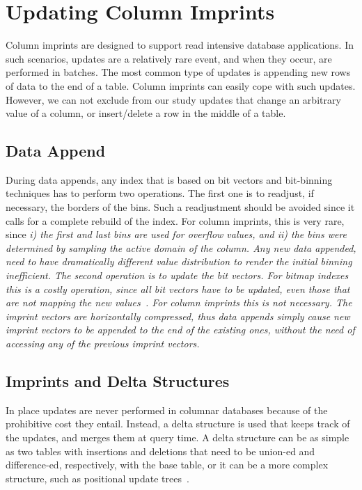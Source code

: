 \section{Updating Column Imprints}\label{sec:updates}

Column imprints are designed to support read intensive database applications.
In such scenarios, updates are a relatively rare event, and when they occur,
are performed in batches. The most common type of updates is appending new
rows of data to the end of a table. Column imprints can easily cope with such
updates. However, we can not exclude from our study updates that change an
arbitrary value of a column, or insert/delete a row in the middle of a table.

\subsection{Data Append}

During data appends, any index that is based on bit vectors and bit-binning
techniques has to perform two operations. The first one is to readjust, if
necessary, the borders of the bins. Such a readjustment should be avoided since
it calls for a complete rebuild of the index. For column imprints, this is very
rare, since \it{i)} the first and last bins are used for overflow values, and
\it{ii)} the bins were determined by sampling the active domain of the column.
Any new data appended, need to have dramatically different value
distribution to render the initial binning inefficient. The second operation
is to update the bit vectors. For bitmap indexes this is a costly
operation, since all bit vectors have to be updated, even those that are not
mapping the new values~\cite{CGF07}. For column imprints this is not necessary.
The imprint vectors are horizontally compressed, thus data appends simply cause
new imprint vectors to be appended to the end of the existing ones, without the
need of accessing any of the previous imprint vectors.

\subsection{Imprints and Delta Structures}

In place updates are never performed in columnar databases because of the
prohibitive cost they entail. Instead, a delta structure is used that keeps
track of the updates, and merges them at query time. A delta structure can
be as simple as two tables with insertions and deletions that need to be
union-ed and difference-ed, respectively, with the base table, or it can be
a more complex structure, such as positional update trees~\cite{HZN+10}.

